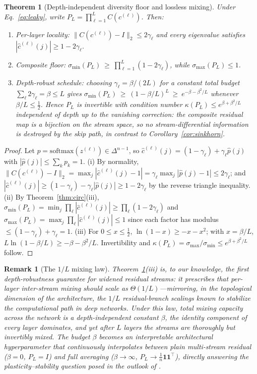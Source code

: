 \documentclass[11pt]{article}
\newtheorem{theorem}{Theorem}
\newtheorem{remark}{Remark}
\newcommand{\ones}{\mathbf{1}}
\newcommand{\J}{\tfrac{1}{n}\ones\ones^{\!\top}}
\begin{document}
\begin{theorem}[Depth-independent diversity floor and lossless mixing]
\label{thm:floor}
Under Eq.~\eqref{eq:leaky}, write $P_L=\prod_{\ell=1}^{L}C(c^{(\ell)})$. Then:
\begin{enumerate}
\item[(i)] Per-layer locality: $\|C(c^{(\ell)})-I\|_2\le 2\gamma_\ell$ and every eigenvalue satisfies $|\hat c^{(\ell)}(j)|\ge 1-2\gamma_\ell$.
\item[(ii)] Composite floor: $\sigma_{\min}(P_L)\ \ge\ \prod_{\ell=1}^{L}(1-2\gamma_\ell)$, while $\sigma_{\max}(P_L)\le1$.
\item[(iii)] Depth-robust schedule: choosing $\gamma_\ell=\beta/(2L)$ for a constant total budget $\sum_\ell 2\gamma_\ell=\beta\le L$ gives
$\sigma_{\min}(P_L)\ \ge\ (1-\beta/L)^{L}\ \ge\ e^{-\beta-\beta^{2}/L}$ whenever $\beta/L\le\tfrac12$.
Hence $P_L$ is invertible with condition number $\kappa(P_L)\le e^{\beta+\beta^2/L}$ \emph{independent of depth up to the vanishing correction}: the composite residual map is a bijection on the stream space, so no stream-differential information is destroyed by the skip path, in contrast to Corollary~\ref{cor:sinkhorn}.
\end{enumerate}
\end{theorem}
\begin{proof}
Let $p=\mathrm{softmax}(z^{(\ell)})\in\Delta^{n-1}$, so $\hat c^{(\ell)}(j)=(1-\gamma_\ell)+\gamma_\ell\hat p(j)$ with $|\hat p(j)|\le\sum_kp_k=1$.
(i) By normality, $\|C(c^{(\ell)})-I\|_2=\max_j|\hat c^{(\ell)}(j)-1|=\gamma_\ell\max_j|\hat p(j)-1|\le2\gamma_\ell$; and $|\hat c^{(\ell)}(j)|\ge(1-\gamma_\ell)-\gamma_\ell|\hat p(j)|\ge1-2\gamma_\ell$ by the reverse triangle inequality.
(ii) By Theorem~\ref{thm:circ}(iii), $\sigma_{\min}(P_L)=\min_j\prod_\ell|\hat c^{(\ell)}(j)|\ge\prod_\ell(1-2\gamma_\ell)$ and $\sigma_{\max}(P_L)=\max_j\prod_\ell|\hat c^{(\ell)}(j)|\le1$ since each factor has modulus $\le(1-\gamma_\ell)+\gamma_\ell=1$.
(iii) For $0\le x\le\tfrac12$, $\ln(1-x)\ge-x-x^{2}$; with $x=\beta/L$, $L\ln(1-\beta/L)\ge-\beta-\beta^{2}/L$. Invertibility and $\kappa(P_L)=\sigma_{\max}/\sigma_{\min}\le e^{\beta+\beta^2/L}$ follow.
\end{proof}

\begin{remark}[The $1/L$ mixing law]
Theorem~\ref{thm:floor}(iii) is, to our knowledge, the first depth-robustness guarantee for widened residual streams: it prescribes that per-layer inter-stream mixing should scale as $\Theta(1/L)$---mirroring, in the \emph{topological} dimension of the architecture, the $1/L$ residual-branch scalings known to stabilize the \emph{computational} path in deep networks. Under this law, total mixing capacity across the network is a depth-independent constant $\beta$, the identity component of every layer dominates, and yet after $L$ layers the streams are thoroughly but \emph{invertibly} mixed. The budget $\beta$ becomes an interpretable architectural hyperparameter that continuously interpolates between plain multi-stream residual ($\beta=0$, $P_L=I$) and full averaging ($\beta\to\infty$, $P_L\to\J$), directly answering the plasticity--stability question posed in the outlook of \citet{xie2025mhc}.
\end{remark}
\end{document}
